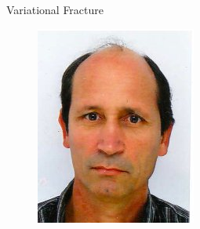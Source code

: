 \documentclass[aspectratio=169,xcolor=dvipsnames,11pt]{beamer}
\begin{document}
\begin{frame}{Variational Fracture}
\begin{minipage}{0.3\textwidth}
\begin{figure}
\begin{minipage}[b]{0.4\textwidth}
    \includegraphics[width=\linewidth]{figures/marigo.jpeg}
  \end{minipage}
  \hfill
  \begin{minipage}[b]{0.4\textwidth}

\end{minipage}
\end{figure}
\end{minipage}
\end{frame}
\end{document}
